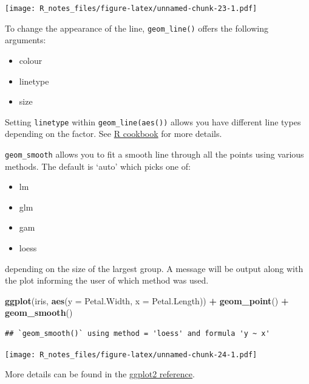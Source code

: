 \documentclass[]{book}
\newenvironment{Shaded}{\begin{snugshade}}{\end{snugshade}}
\newcommand{\KeywordTok}[1]{\textcolor[rgb]{0.13,0.29,0.53}{\textbf{#1}}}
\newcommand{\DataTypeTok}[1]{\textcolor[rgb]{0.13,0.29,0.53}{#1}}
\newcommand{\StringTok}[1]{\textcolor[rgb]{0.31,0.60,0.02}{#1}}
\newcommand{\OperatorTok}[1]{\textcolor[rgb]{0.81,0.36,0.00}{\textbf{#1}}}
\newcommand{\NormalTok}[1]{#1}
\providecommand{\tightlist}{%
  \setlength{\itemsep}{0pt}\setlength{\parskip}{0pt}}
\begin{document}
\texttt{[image: R\_notes\_files/figure-latex/unnamed-chunk-23-1.pdf]}

To change the appearance of the line, \texttt{geom\_line()} offers the
following arguments:

\begin{itemize}
\tightlist
\item
  colour
\item
  linetype
\item
  size
\end{itemize}

Setting \texttt{linetype} within \texttt{geom\_line(aes())} allows you
have different line types depending on the factor. See
\href{http://www.cookbook-r.com/Graphs/Bar_and_line_graphs_(ggplot2)/}{R
cookbook} for more details.

\texttt{geom\_smooth} allows you to fit a smooth line through all the
points using various methods. The default is `auto' which picks one of:

\begin{itemize}
\tightlist
\item
  lm
\item
  glm
\item
  gam
\item
  loess
\end{itemize}

depending on the size of the largest group. A message will be output
along with the plot informing the user of which method was used.

\begin{Shaded}
\begin{Highlighting}[]
\KeywordTok{ggplot}\NormalTok{(iris, }\KeywordTok{aes}\NormalTok{(}\DataTypeTok{y =}\NormalTok{ Petal.Width, }\DataTypeTok{x =}\NormalTok{ Petal.Length)) }\OperatorTok{+}\StringTok{ }
\StringTok{  }\KeywordTok{geom_point}\NormalTok{() }\OperatorTok{+}\StringTok{ }
\StringTok{  }\KeywordTok{geom_smooth}\NormalTok{()}
\end{Highlighting}
\end{Shaded}

\begin{verbatim}
## `geom_smooth()` using method = 'loess' and formula 'y ~ x'
\end{verbatim}

\texttt{[image: R\_notes\_files/figure-latex/unnamed-chunk-24-1.pdf]}

More details can be found in the
\href{https://ggplot2.tidyverse.org/reference/geom_smooth.html}{ggplot2
reference}.
\end{document}
